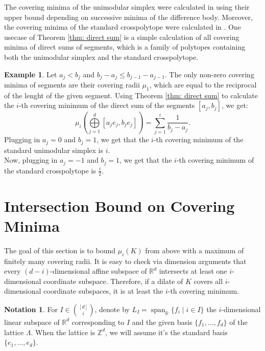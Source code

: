 \documentclass{amsart}
\theoremstyle{definition}
\newtheorem{example}[theorem]{Example}
\newtheorem{notation}[theorem]{Notation}
\theoremstyle{remark}
\newcommand{\R}{\mathbb{R}}
\newcommand{\Z}{\mathbb{Z}}
\begin{document}
The covering minima of the unimodular simplex were calculated in \cite{KannanLovasz} using their upper bound depending on successive minima of the difference body. Moreover, the covering minima of the standard crosspolytope were calculated in \cite{MerinoSchymura}. One usecase of Theorem \ref{thm: direct sum} is a simple calculation of all covering minima of direct sums of segments, which is a family of polytopes containing both the unimodular simplex and the standard crosspolytope.

\begin{example} Let $a_j<b_j$ and $b_j-a_j\leqslant b_{j-1}-a_{j-1}$. The only non-zero covering minima of segments are their covering radii $\mu_1$, which are equal to the reciprocal of the lenght of the given segment. Using Theorem \ref{thm: direct sum} to calculate the $i$-th covering minimum of the direct sum of the segments $[a_j,b_j]$, we get:
$$\mu_i\left(\bigoplus\limits_{j=1}^d [a_je_j, b_je_j]\right) = \sum_{j=1}^{i}\frac{1}{b_j-a_j}.$$
Plugging in $a_j=0$ and $b_j=1$, we get that the $i$-th covering minimum of the standard unimodular simplex is $i$.\\
Now, plugging in $a_j=-1$ and $b_j=1$, we get that the $i$-th covering minimum of the standard crosspolytope is $\frac{i}{2}$.
\end{example}


\section{Intersection Bound on Covering Minima}\label{sec:intersection}


The goal of this section is to bound $\mu_i(K)$ from above with a maximum of finitely many covering radii. It is easy to check via dimension arguments that every $(d-i)$-dimensional affine subspace of $\R^d$ intersects at least one $i$-dimensional coordinate subspace. Therefore, if a dilate of $K$ covers all $i$-dimensional coordinate subspaces, it is at least the $i$-th covering minimum.\\

\begin{notation} For $I\in {[d]\choose i}$, denote by $L_I=\operatorname{span}_\R\{f_i\; |\; i\in I \}$ the $i$-dimensional linear subspace of $\R^d$ corresponding to $I$ and the given basis $\{f_1,\dots, f_d\}$ of the lattice $\Lambda$. When the lattice is $\Z^d$, we will assume it's the standard basis $\{e_1,\dots,e_d\}$.
\end{notation}
\end{document}
